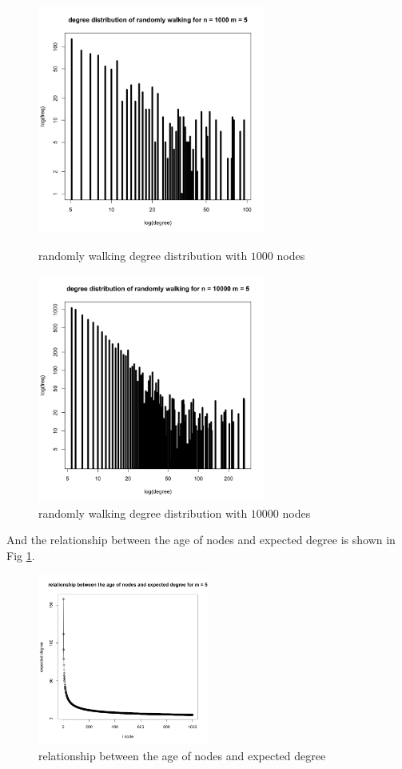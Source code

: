 \documentclass[draftcls,12pt,onecolumn]{IEEEtran}
\begin{document}
\begin{figure}[htbp]
\centering
\begin{minipage}[t]{0.48\textwidth}
\centering
\includegraphics[width=7.5cm]{img/2_g_2_degree3}
\caption{randomly walking degree distribution with $1000$ nodes}
\end{minipage}
\begin{minipage}[t]{0.48\textwidth}
\centering
\includegraphics[width=7.5cm]{img/2_g_2_degree4}
\caption{randomly walking degree distribution with $10000$ nodes}
\end{minipage}
\end{figure}

And the relationship between the age of nodes and expected degree is shown in Fig \ref{2g2relat}.

\begin{figure}[h]
\centering
\includegraphics[width=0.5\textwidth]{img/2_g_2_relat}
\caption{relationship between the age of nodes and expected degree}
\label{2g2relat}
\end{figure}
\end{document}
